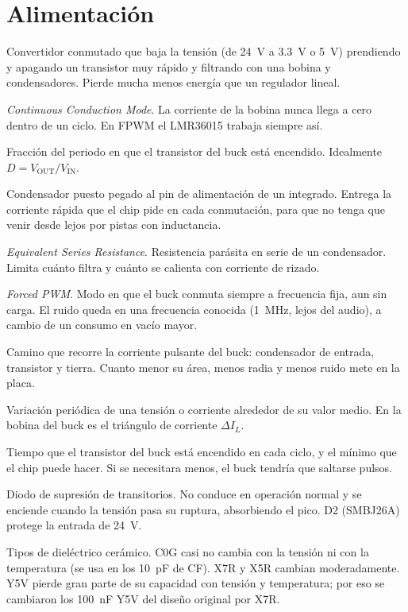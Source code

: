 \section*{Alimentación}
\begin{description}[style=sameline,leftmargin=1.5em,labelindent=0pt]
  \item[Buck] Convertidor conmutado que baja la tensión (de \SI{24}{\volt} a \SI{3.3}{\volt} o \SI{5}{\volt}) prendiendo y
  apagando un transistor muy rápido y filtrando con una bobina y condensadores. Pierde mucha menos energía que un
  regulador lineal.
  \item[CCM] \emph{Continuous Conduction Mode}. La corriente de la bobina nunca llega a cero dentro de un ciclo. En FPWM
  el LMR36015 trabaja siempre así.
  \item[Ciclo útil ($D$)] Fracción del periodo en que el transistor del buck está encendido. Idealmente
  $D = V_\text{OUT}/V_\text{IN}$.
  \item[Desacoplo] Condensador puesto pegado al pin de alimentación de un integrado. Entrega la corriente rápida que el
  chip pide en cada conmutación, para que no tenga que venir desde lejos por pistas con inductancia.
  \item[ESR] \emph{Equivalent Series Resistance}. Resistencia parásita en serie de un condensador. Limita cuánto filtra
  y cuánto se calienta con corriente de rizado.
  \item[FPWM] \emph{Forced PWM}. Modo en que el buck conmuta siempre a frecuencia fija, aun sin carga. El ruido queda en
  una frecuencia conocida (\SI{1}{\mega\hertz}, lejos del audio), a cambio de un consumo en vacío mayor.
  \item[Lazo de potencia (hot loop)] Camino que recorre la corriente pulsante del buck: condensador de entrada,
  transistor y tierra. Cuanto menor su área, menos radia y menos ruido mete en la placa.
  \item[Rizado] Variación periódica de una tensión o corriente alrededor de su valor medio. En la bobina del buck es el
  triángulo de corriente $\Delta I_L$.
  \item[$t_\text{ON}$ / $t_\text{ON-MIN}$] Tiempo que el transistor del buck está encendido en cada ciclo, y el mínimo
  que el chip puede hacer. Si se necesitara menos, el buck tendría que saltarse pulsos.
  \item[TVS] Diodo de supresión de transitorios. No conduce en operación normal y se enciende cuando la tensión pasa su
  ruptura, absorbiendo el pico. D2 (SMBJ26A) protege la entrada de \SI{24}{\volt}.
  \item[X7R, X5R, C0G, Y5V] Tipos de dieléctrico cerámico. C0G casi no cambia con la tensión ni con la temperatura
  (se usa en los \SI{10}{\pico\farad} de CF). X7R y X5R cambian moderadamente. Y5V pierde gran parte de su capacidad con
  tensión y temperatura; por eso se cambiaron los \SI{100}{\nano\farad} Y5V del diseño original por X7R.
\end{description}

